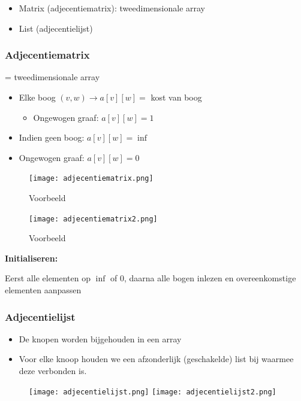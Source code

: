 \documentclass{article}
\begin{document}
\begin{itemize}
    \item Matrix (adjecentiematrix): tweedimensionale array
    \item List (adjecentielijst)
\end{itemize}

\subsubsection{Adjecentiematrix}

= tweedimensionale array

\begin{itemize}
    \item Elke boog $(v,w) \rightarrow a[v][w] =$ kost van boog
    \begin{itemize}
        \item Ongewogen graaf: $a[v][w] = 1$
    \end{itemize} 
    \item Indien geen boog: $a[v][w] = \inf$
    \item Ongewogen graaf: $a[v][w] = 0$
\end{itemize}

\begin{figure}[H]
    \centering
    \texttt{[image: adjecentiematrix.png]}
    \caption{Voorbeeld}
\end{figure}

\begin{figure}[H]
    \centering
    \texttt{[image: adjecentiematrix2.png]}
    \caption{Voorbeeld}
\end{figure}

\textbf{Initialiseren:}

Eerst alle elementen op $\inf$ of $0$, daarna alle bogen inlezen en overeenkomstige elementen aanpassen


\subsubsection{Adjecentielijst}

\begin{itemize}
    \item De knopen worden bijgehouden in een array
    \item Voor elke knoop houden we een afzonderlijk (geschakelde) list bij waarmee deze verbonden is.
\end{itemize}

\begin{figure}[H]
    \centering
    \texttt{[image: adjecentielijst.png]}
    \texttt{[image: adjecentielijst2.png]}
\end{figure}
\end{document}
